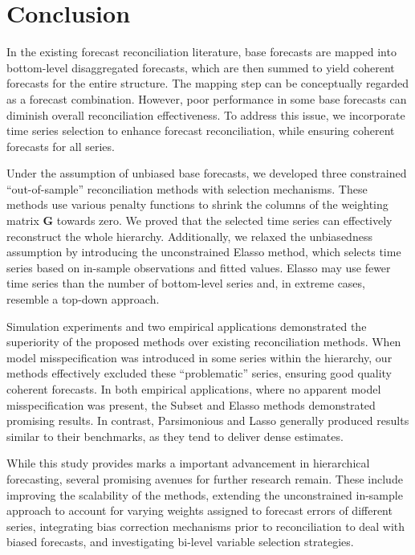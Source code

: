 \documentclass[
  11pt]{article}
\theoremstyle{plain}
\theoremstyle{remark}
\begin{document}
\section{Conclusion}\label{sec-conclusion}

In the existing forecast reconciliation literature, base forecasts are
mapped into bottom-level disaggregated forecasts, which are then summed
to yield coherent forecasts for the entire structure. The mapping step
can be conceptually regarded as a forecast combination. However, poor
performance in some base forecasts can diminish overall reconciliation
effectiveness. To address this issue, we incorporate time series
selection to enhance forecast reconciliation, while ensuring coherent
forecasts for all series.

Under the assumption of unbiased base forecasts, we developed three
constrained ``out-of-sample'' reconciliation methods with selection
mechanisms. These methods use various penalty functions to shrink the
columns of the weighting matrix \(\bm{G}\) towards zero. We proved that
the selected time series can effectively reconstruct the whole
hierarchy. Additionally, we relaxed the unbiasedness assumption by
introducing the unconstrained Elasso method, which selects time series
based on in-sample observations and fitted values. Elasso may use fewer
time series than the number of bottom-level series and, in extreme
cases, resemble a top-down approach.

Simulation experiments and two empirical applications demonstrated the
superiority of the proposed methods over existing reconciliation
methods. When model misspecification was introduced in some series
within the hierarchy, our methods effectively excluded these
``problematic'' series, ensuring good quality coherent forecasts. In
both empirical applications, where no apparent model misspecification
was present, the Subset and Elasso methods demonstrated promising
results. In contrast, Parsimonious and Lasso generally produced results
similar to their benchmarks, as they tend to deliver dense estimates.

While this study provides marks a important advancement in hierarchical
forecasting, several promising avenues for further research remain.
These include improving the scalability of the methods, extending the
unconstrained in-sample approach to account for varying weights assigned
to forecast errors of different series, integrating bias correction
mechanisms prior to reconciliation to deal with biased forecasts, and
investigating bi-level variable selection strategies.
\end{document}
